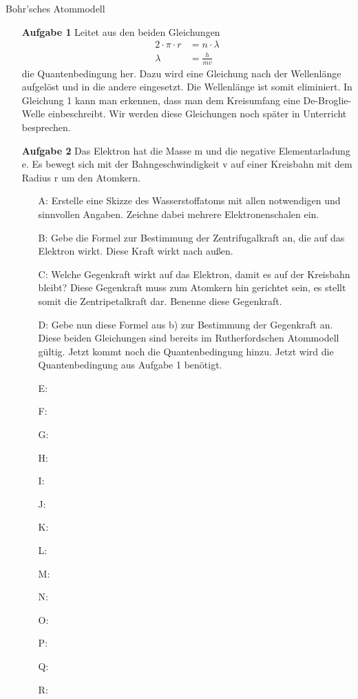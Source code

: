 \documentclass[11pt,a4paper,oneside]{article}
\begin{document}
	\begin{aufgabe}{Bohr'sches Atommodell}
		\small
		\begin{itemize}[left=20mm]
			\item [\textbf{Aufgabe 1}] Leitet aus den beiden Gleichungen 
			\begin{align*}
				2 \cdot \pi \cdot r &= n \cdot \lambda \\
				\lambda &= \frac{h}{mv}
			\end{align*}
			die Quantenbedingung her. Dazu wird eine Gleichung nach der Wellenlänge aufgelöst und in die
			andere eingesetzt. Die Wellenlänge ist somit eliminiert. In Gleichung 1 kann man erkennen, dass man
			dem Kreisumfang eine De-Broglie-Welle einbeschreibt. Wir werden diese Gleichungen noch später in
			Unterricht besprechen.
			\item [\textbf{Aufgabe 2}] 
			Das Elektron hat die Masse m und die negative Elementarladung e. Es bewegt sich mit der Bahngeschwindigkeit v auf einer Kreisbahn mit dem Radius r um den Atomkern.
			\begin{itemize}[left=-10mm]
				\item [A:] Erstelle eine Skizze des Wasserstoffatoms mit allen notwendigen und sinnvollen Angaben. Zeichne dabei mehrere Elektronenschalen ein.
				\item [B:] Gebe die Formel zur Bestimmung der Zentrifugalkraft an, die auf das Elektron wirkt. Diese
				Kraft wirkt nach außen.
				\item [C:] Welche Gegenkraft wirkt auf das Elektron, damit es auf der Kreisbahn bleibt? Diese Gegenkraft muss zum Atomkern hin gerichtet sein, es stellt somit die Zentripetalkraft dar. Benenne diese Gegenkraft.
				\item [D:] Gebe nun diese Formel aus b) zur Bestimmung der Gegenkraft an. \\
				Diese beiden Gleichungen sind bereits im Rutherfordschen Atommodell gültig. Jetzt kommt noch die
				Quantenbedingung hinzu. Jetzt wird die Quantenbedingung aus Aufgabe 1 benötigt.
				\item [E:]
				\item [F:]
				\item [G:]
				\item [H:]
				\item [I:]
				\item [J:]
				\item [K:]
				\item [L:]
				\item [M:]
				\item [N:]
				\item [O:]
				\item [P:]
				\item [Q:]
				\item [R:]		
			\end{itemize}
		\end{itemize}
	\end{aufgabe}
	
\end{document}

